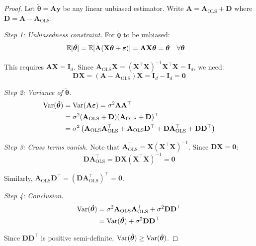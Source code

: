 \documentclass[main.tex]{subfiles}
\begin{document}
\begin{proof}
Let $\tilde{\boldsymbol{\theta}} = \mathbf{A}\mathbf{y}$ be any linear unbiased estimator. Write $\mathbf{A} = \mathbf{A}_{\text{OLS}} + \mathbf{D}$ where $\mathbf{D} = \mathbf{A} - \mathbf{A}_{\text{OLS}}$.

\textit{Step 1: Unbiasedness constraint.} For $\tilde{\boldsymbol{\theta}}$ to be unbiased:
\begin{align}
\mathbb{E}[\tilde{\boldsymbol{\theta}}] &= \mathbb{E}[\mathbf{A}(\mathbf{X}\boldsymbol{\theta} + \boldsymbol{\varepsilon})] = \mathbf{A}\mathbf{X}\boldsymbol{\theta} = \boldsymbol{\theta} \quad \forall \boldsymbol{\theta}
\end{align}

This requires $\mathbf{A}\mathbf{X} = \mathbf{I}_d$. Since $\mathbf{A}_{\text{OLS}}\mathbf{X} = (\mathbf{X}^\top\mathbf{X})^{-1}\mathbf{X}^\top\mathbf{X} = \mathbf{I}_d$, we need:
$$\mathbf{D}\mathbf{X} = (\mathbf{A} - \mathbf{A}_{\text{OLS}})\mathbf{X} = \mathbf{I}_d - \mathbf{I}_d = \mathbf{0}$$

\textit{Step 2: Variance of $\tilde{\boldsymbol{\theta}}$.}
\begin{align}
\text{Var}(\tilde{\boldsymbol{\theta}}) &= \text{Var}(\mathbf{A}\boldsymbol{\varepsilon}) = \sigma^2 \mathbf{A}\mathbf{A}^\top \\
&= \sigma^2 (\mathbf{A}_{\text{OLS}} + \mathbf{D})(\mathbf{A}_{\text{OLS}} + \mathbf{D})^\top \\
&= \sigma^2 \left(\mathbf{A}_{\text{OLS}}\mathbf{A}_{\text{OLS}}^\top + \mathbf{A}_{\text{OLS}}\mathbf{D}^\top + \mathbf{D}\mathbf{A}_{\text{OLS}}^\top + \mathbf{D}\mathbf{D}^\top\right)
\end{align}

\textit{Step 3: Cross terms vanish.} Note that $\mathbf{A}_{\text{OLS}}^\top = \mathbf{X}(\mathbf{X}^\top\mathbf{X})^{-1}$. Since $\mathbf{D}\mathbf{X} = \mathbf{0}$:
$$\mathbf{D}\mathbf{A}_{\text{OLS}}^\top = \mathbf{D}\mathbf{X}(\mathbf{X}^\top\mathbf{X})^{-1} = \mathbf{0}$$

Similarly, $\mathbf{A}_{\text{OLS}}\mathbf{D}^\top = (\mathbf{D}\mathbf{A}_{\text{OLS}}^\top)^\top = \mathbf{0}$.

\textit{Step 4: Conclusion.}
\begin{align}
\text{Var}(\tilde{\boldsymbol{\theta}}) &= \sigma^2 \mathbf{A}_{\text{OLS}}\mathbf{A}_{\text{OLS}}^\top + \sigma^2 \mathbf{D}\mathbf{D}^\top \\
&= \text{Var}(\hat{\boldsymbol{\theta}}) + \sigma^2 \mathbf{D}\mathbf{D}^\top
\end{align}

Since $\mathbf{D}\mathbf{D}^\top$ is positive semi-definite, $\text{Var}(\tilde{\boldsymbol{\theta}}) \geq \text{Var}(\hat{\boldsymbol{\theta}})$.
\end{proof}
\end{document}
